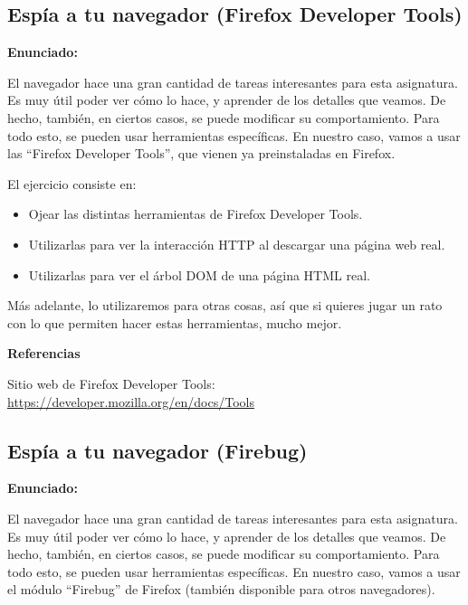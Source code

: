 \subsection{Espía a tu navegador (Firefox Developer Tools)}
\label{subsec:firefox-devel}

\textbf{Enunciado:}

El navegador hace una gran cantidad de tareas interesantes para esta asignatura. Es muy útil poder ver cómo lo hace, y aprender de los detalles que veamos. De hecho, también, en ciertos casos, se puede modificar su comportamiento. Para todo esto, se pueden usar herramientas específicas. En nuestro caso, vamos a usar las ``Firefox Developer Tools'', que vienen ya preinstaladas en Firefox.

El ejercicio consiste en:

\begin{itemize}
\item Ojear las distintas herramientas de Firefox Developer Tools.
\item Utilizarlas para ver la interacción HTTP al descargar una página web real.
\item Utilizarlas para ver el árbol DOM de una página HTML real.
\end{itemize}

Más adelante, lo utilizaremos para otras cosas, así que si quieres jugar un rato con lo que permiten hacer estas herramientas, mucho mejor.

\textbf{Referencias}

Sitio web de Firefox Developer Tools: \\
\url{https://developer.mozilla.org/en/docs/Tools}



\subsection{Espía a tu navegador (Firebug)}
\label{subsec:firebug}

\textbf{Enunciado:}

El navegador hace una gran cantidad de tareas interesantes para esta asignatura. Es muy útil poder ver cómo lo hace, y aprender de los detalles que veamos. De hecho, también, en ciertos casos, se puede modificar su comportamiento. Para todo esto, se pueden usar herramientas específicas. En nuestro caso, vamos a usar el módulo ``Firebug'' de Firefox (también disponible para otros navegadores).

